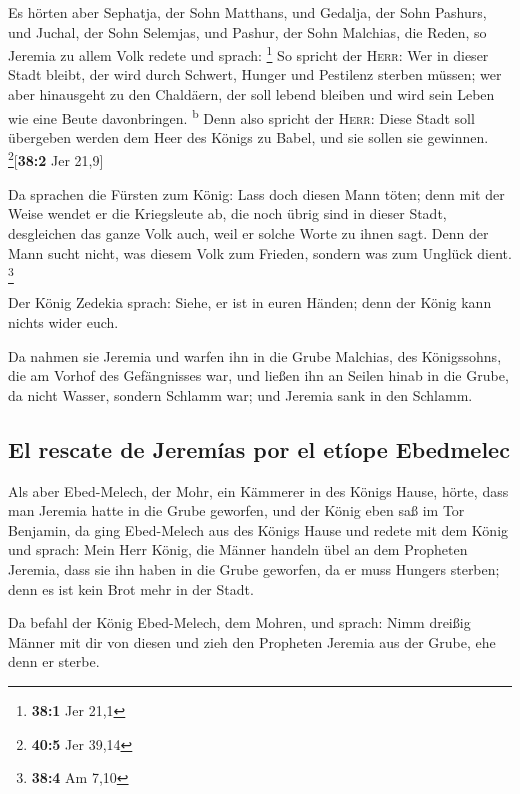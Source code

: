  Es hörten aber Sephatja, der Sohn Matthans, und Gedalja,
der Sohn Pashurs, und Juchal, der Sohn Selemjas, und Pashur, der Sohn
Malchias, die Reden, so Jeremia zu allem Volk redete und sprach:
\footnote{\textbf{38:1} Jer 21,1}  So spricht der
\textsc{Herr}: Wer in dieser Stadt bleibt, der wird durch Schwert,
Hunger und Pestilenz sterben müssen; wer aber hinausgeht zu den
Chaldäern, der soll lebend bleiben und wird sein Leben wie eine Beute
davonbringen. \textsuperscript{b}  Denn also spricht der
\textsc{Herr}: Diese Stadt soll übergeben werden dem Heer des Königs zu
Babel, und sie sollen sie gewinnen. \footnote{\textbf{40:5} Jer 39,14}{[}\textbf{38:2}
Jer 21,9{]}

 Da sprachen die Fürsten zum König: Lass doch diesen Mann
töten; denn mit der Weise wendet er die Kriegsleute ab, die noch übrig
sind in dieser Stadt, desgleichen das ganze Volk auch, weil er solche
Worte zu ihnen sagt. Denn der Mann sucht nicht, was diesem Volk zum
Frieden, sondern was zum Unglück dient. \footnote{\textbf{38:4} Am 7,10}

 Der König Zedekia sprach: Siehe, er ist in euren Händen;
denn der König kann nichts wider euch.

 Da nahmen sie Jeremia und warfen ihn in die Grube
Malchias, des Königssohns, die am Vorhof des Gefängnisses war, und
ließen ihn an Seilen hinab in die Grube, da nicht Wasser, sondern
Schlamm war; und Jeremia sank in den Schlamm.

\hypertarget{el-rescate-de-jeremuxedas-por-el-etuxedope-ebedmelec}{%
\subsection{El rescate de Jeremías por el etíope
Ebedmelec}\label{el-rescate-de-jeremuxedas-por-el-etuxedope-ebedmelec}}

 Als aber Ebed-Melech, der Mohr, ein Kämmerer in des
Königs Hause, hörte, dass man Jeremia hatte in die Grube geworfen, und
der König eben saß im Tor Benjamin,  da ging Ebed-Melech
aus des Königs Hause und redete mit dem König und sprach: 
Mein Herr König, die Männer handeln übel an dem Propheten Jeremia, dass
sie ihn haben in die Grube geworfen, da er muss Hungers sterben; denn es
ist kein Brot mehr in der Stadt.

 Da befahl der König Ebed-Melech, dem Mohren, und sprach:
Nimm dreißig Männer mit dir von diesen und zieh den Propheten Jeremia
aus der Grube, ehe denn er sterbe.

